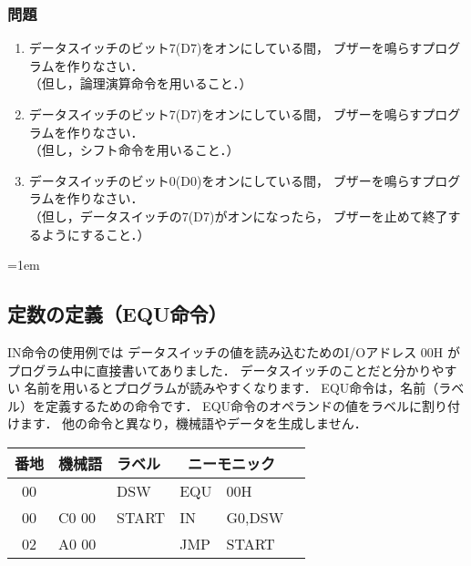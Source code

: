 \subsubsection{問題}
\begin{enumerate}
\item データスイッチのビット7(D7)をオンにしている間，
  ブザーを鳴らすプログラムを作りなさい．\\
  （但し，論理演算命令を用いること．）
\item データスイッチのビット7(D7)をオンにしている間，
  ブザーを鳴らすプログラムを作りなさい．\\
  （但し，シフト命令を用いること．）
\item データスイッチのビット0(D0)をオンにしている間，
  ブザーを鳴らすプログラムを作りなさい．\\
  （但し，データスイッチの7(D7)がオンになったら，
    ブザーを止めて終了するようにすること．）
\end{enumerate}
\vfill

\begin{framed}{\parindent=1em
  \subsection*{定数の定義（EQU命令）}
  {\small IN命令の使用例では
    データスイッチの値を読み込むためのI/Oアドレス 00H が
    プログラム中に直接書いてありました．
    データスイッチのことだと分かりやすい
    名前を用いるとプログラムが読みやすくなります．
    EQU命令は，名前（ラベル）を定義するための命令です．
    EQU命令のオペランドの値をラベルに割り付けます．
    他の命令と異なり，機械語やデータを生成しません．
    
    {\ttfamily\small\begin{center}
      \begin{tabular}{|c|l|l|l l|l}
        \hline
        番地 & 機械語 & ラベル & \multicolumn{2}{|c|}{ニーモニック} \\
        \hline
        00 &       & DSW   & EQU  & 00H     \\
        00 & C0 00 & START & IN   & G0,DSW  \\
        02 & A0 00 &       & JMP  & START   \\ 
        \hline
      \end{tabular}
  \end{center}}}
}\end{framed}

